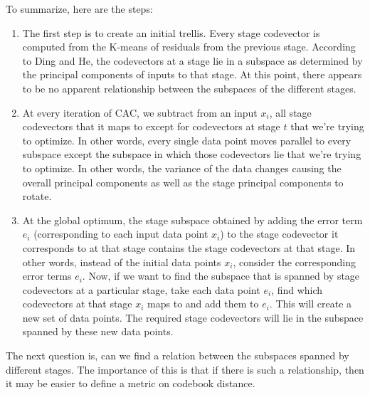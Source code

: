 \documentclass[12pt,letterpaper,doublespaced,ETD]{gt-ece-thesis}
\begin{document}
To summarize, here are the steps:

\begin{enumerate}
\item The first step is to create an initial trellis.  Every stage codevector is computed from the K-means of residuals from the previous stage.  According to Ding and He, the codevectors at a stage lie in a subspace as determined by the principal components of inputs to that stage.  At this point, there appears to be no apparent relationship between the subspaces of the different stages.
\item At every iteration of CAC, we subtract from an input $x_i$, all stage codevectors that it maps to except for codevectors at stage $t$ that we're trying to optimize.  In other words, every single data point moves parallel to every subspace except the subspace in which those codevectors lie that we're trying to optimize.  In other words, the variance of the data changes causing the overall principal components as well as the stage principal components to rotate.
\item At the global optimum, the stage subspace obtained by adding the error term $e_i$ (corresponding to each input data point $x_i$) to the stage codevector it corresponds to at that stage contains the stage codevectors at that stage.  In other words, instead of the initial data points $x_i$, consider the corresponding error terms $e_i$.  Now, if we want to find the subspace that is spanned by stage codevectors at a particular stage, take each data point $e_i$, find which codevectors at that stage $x_i$ maps to and add them to $e_i$.  This will create a new set of data points.  The required stage codevectors will lie in the subspace spanned by these new data points.
\end{enumerate}

The next question is, can we find a relation between the subspaces spanned by different stages.  The importance of this is that if there is such a relationship, then it may be easier to define a metric on codebook distance.
\end{document}
